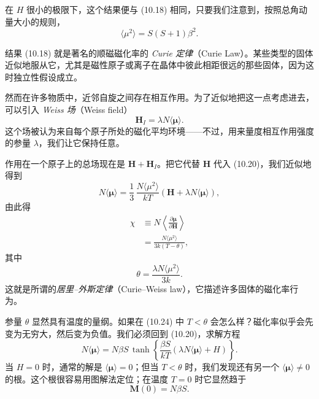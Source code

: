 在 $H$ 很小的极限下，这个结果便与 (10.18) 相同，只要我们注意到，按照总角动量大小的规则，
\begin{equation*}
\langle\mu^{2}\rangle=S(S+1)\beta^{2}.
\tag{10.21}
\end{equation*}

结果 (10.18) 就是著名的顺磁磁化率的 \emph{Curie 定律}（Curie Law）。某些类型的固体近似地服从它，尤其是磁性原子或离子在晶体中彼此相距很远的那些固体，因为这时独立性假设成立。

然而在许多物质中，近邻自旋之间存在相互作用。为了近似地把这一点考虑进去，可以引入 \emph{Weiss 场}（Weiss field）
\begin{equation*}
\mathbf{H}_{I}=\lambda N\langle\boldsymbol{\mu}\rangle.
\tag{10.22}
\end{equation*}
这个场被认为来自每个原子所处的磁化平均环境——不过，用来量度相互作用强度的参量 $\lambda$，我们让它保持任意。

作用在一个原子上的总场现在是 $\mathbf{H}+\mathbf{H}_{I}$。把它代替 $\mathbf{H}$ 代入 (10.20)，我们近似地得到
\begin{equation*}
N\langle\boldsymbol{\mu}\rangle=\frac{1}{3}\,\frac{N\langle\mu^{2}\rangle}{kT}\left(\mathbf{H}+\lambda N\langle\boldsymbol{\mu}\rangle\right),
\tag{10.23}
\end{equation*}
由此得
\begin{align*}
\chi &\equiv N\left\langle\frac{\partial\boldsymbol{\mu}}{\partial\mathbf{H}}\right\rangle\\
&=\frac{N\langle\mu^{2}\rangle}{3k(T-\theta)},
\tag{10.24}
\end{align*}
其中
\begin{equation*}
\theta=\frac{\lambda N\langle\mu^{2}\rangle}{3k}.
\tag{10.25}
\end{equation*}
这就是所谓的\emph{居里--外斯定律}（Curie--Weiss law），它描述许多固体的磁化率行为。

参量 $\theta$ 显然具有温度的量纲。如果在 (10.24) 中 $T<\theta$ 会怎么样？磁化率似乎会先变为无穷大，然后变为负值。我们必须回到 (10.20)，求解方程
\begin{equation*}
N\langle\boldsymbol{\mu}\rangle=N\beta S\,\tanh\left\{\frac{\beta S}{kT}\left(\lambda N\langle\boldsymbol{\mu}\rangle+H\right)\right\}.
\tag{10.26}
\end{equation*}
当 $H=0$ 时，通常的解是 $\langle\boldsymbol{\mu}\rangle=0$；但当 $T<\theta$ 时，我们发现还有另一个 $\langle\boldsymbol{\mu}\rangle\neq 0$ 的根。这个根很容易用图解法定位；在温度 $T=0$ 时它显然趋于
\begin{equation*}
\mathbf{M}(0)=N\beta S.
\tag{10.27}
\end{equation*}

